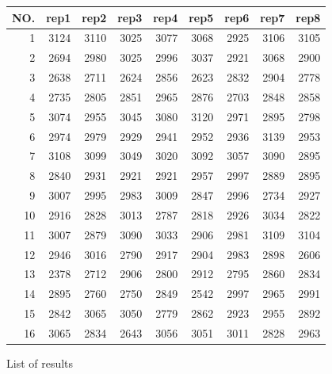 \begin{figure}[H]
	\label{table:appendix:hyperparameter_tuning:final_taguchi}
	\centering
	\begin{tabular}{ rrrrrrrrr }
		\hline
		NO.& rep1 & rep2 & rep3 & rep4 & rep5 & rep6 & rep7 & rep8\\
		\hline
		1 & 3124 & 3110 & 3025 & 3077 & 3068 & 2925 & 3106 & 3105 \\ 
		2 & 2694 & 2980 & 3025 & 2996 & 3037 & 2921 & 3068 & 2900 \\ 
		3 & 2638 & 2711 & 2624 & 2856 & 2623 & 2832 & 2904 & 2778 \\ 
		4 & 2735 & 2805 & 2851 & 2965 & 2876 & 2703 & 2848 & 2858 \\ 
		5 & 3074 & 2955 & 3045 & 3080 & 3120 & 2971 & 2895 & 2798 \\ 
		6 & 2974 & 2979 & 2929 & 2941 & 2952 & 2936 & 3139 & 2953 \\ 
		7 & 3108 & 3099 & 3049 & 3020 & 3092 & 3057 & 3090 & 2895 \\ 
		8 & 2840 & 2931 & 2921 & 2921 & 2957 & 2997 & 2889 & 2895 \\ 
		9 & 3007 & 2995 & 2983 & 3009 & 2847 & 2996 & 2734 & 2927 \\ 
		10 & 2916 & 2828 & 3013 & 2787 & 2818 & 2926 & 3034 & 2822 \\ 
		11 & 3007 & 2879 & 3090 & 3033 & 2906 & 2981 & 3109 & 3104 \\ 
		12 & 2946 & 3016 & 2790 & 2917 & 2904 & 2983 & 2898 & 2606 \\ 
		13 & 2378 & 2712 & 2906 & 2800 & 2912 & 2795 & 2860 & 2834 \\ 
		14 & 2895 & 2760 & 2750 & 2849 & 2542 & 2997 & 2965 & 2991 \\ 
		15 & 2842 & 3065 & 3050 & 2779 & 2862 & 2923 & 2955 & 2892 \\ 
		16 & 3065 & 2834 & 2643 & 3056 & 3051 & 3011 & 2828 & 2963 \\ 
		\hline
	\end{tabular}
	\caption{List of results}

\end{figure}